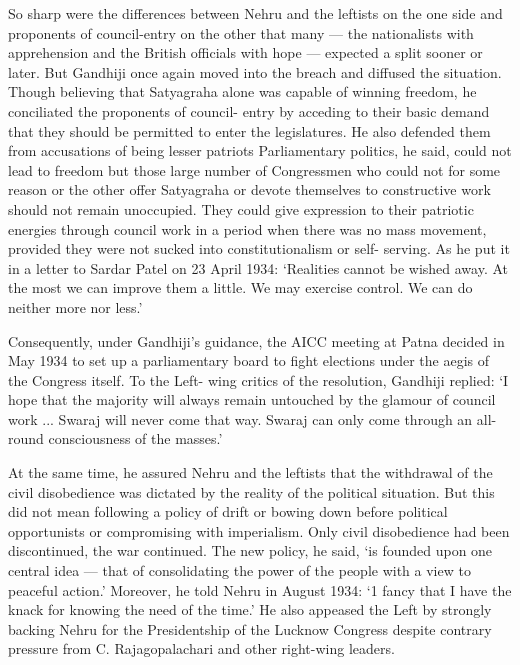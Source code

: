 \begin{multicols}{2}
So sharp were the differences between Nehru and the leftists on the one side and proponents of council-entry on the other that many --- the nationalists with apprehension and the British officials with hope --- expected a split sooner or later. But Gandhiji once again moved into the breach and diffused the situation. Though believing that Satyagraha alone was capable of winning freedom, he conciliated the proponents of council- entry by acceding to their basic demand that they should be permitted to enter the legislatures. He also defended them from accusations of being lesser patriots Parliamentary politics, he said, could not lead to freedom but those large number of Congressmen who could not for some reason or the other offer Satyagraha or devote themselves to constructive work should not remain unoccupied. They could give expression to their patriotic energies through council work in a period when there was no mass movement, provided they were not sucked into constitutionalism or self- serving. As he put it in a letter to Sardar Patel on 23 April 1934: `Realities cannot be wished away. At the most we can improve them a little. We may exercise control. We can do neither more nor less.' 

Consequently, under Gandhiji's guidance, the AICC meeting at Patna decided in May 1934 to set up a parliamentary board to fight elections under the aegis of the Congress itself. To the Left- wing critics of the resolution, Gandhiji replied: `I hope that the majority will always remain untouched by the glamour of council work ... Swaraj will never come that way. Swaraj can only come through an all-round consciousness of the masses.' 

At the same time, he assured Nehru and the leftists that the withdrawal of the civil disobedience was dictated by the reality of the political situation. But this did not mean following a policy of drift or bowing down before political opportunists or compromising with imperialism. Only civil disobedience had been discontinued, the war continued. The new policy, he said, `is founded upon one central idea --- that of consolidating the power of the people with a view to peaceful action.' Moreover, he told Nehru in August 1934: `1 fancy that I have the knack for knowing the need of the time.' He also appeased the Left by strongly backing Nehru for the Presidentship of the Lucknow Congress despite contrary pressure from C. Rajagopalachari and other right-wing leaders. 


\end{multicols}
